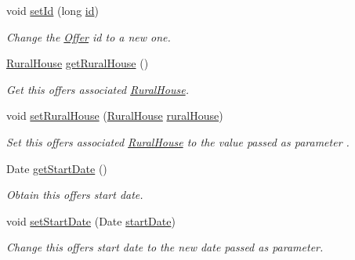 \begin{DoxyCompactItemize}
void \mbox{\hyperlink{classcom_1_1ruralhousejsf_1_1domain_1_1_offer_a470323b09c0c64417eb21c748d008045}{set\+Id}} (long \mbox{\hyperlink{classcom_1_1ruralhousejsf_1_1domain_1_1_offer_aba6516f5b9bb2dbe5d8b99404335adfc}{id}})
\begin{DoxyCompactList}\small\item\em Change the \mbox{\hyperlink{classcom_1_1ruralhousejsf_1_1domain_1_1_offer}{Offer}} id to a new one. \end{DoxyCompactList}\item 
\mbox{\hyperlink{classcom_1_1ruralhousejsf_1_1domain_1_1_rural_house}{Rural\+House}} \mbox{\hyperlink{classcom_1_1ruralhousejsf_1_1domain_1_1_offer_a431afac3e582055bb908b715f2d22bdd}{get\+Rural\+House}} ()
\begin{DoxyCompactList}\small\item\em Get this offers associated \mbox{\hyperlink{classcom_1_1ruralhousejsf_1_1domain_1_1_rural_house}{Rural\+House}}. \end{DoxyCompactList}\item 
void \mbox{\hyperlink{classcom_1_1ruralhousejsf_1_1domain_1_1_offer_ab10c2d200d23aff2383f720b1dcecd02}{set\+Rural\+House}} (\mbox{\hyperlink{classcom_1_1ruralhousejsf_1_1domain_1_1_rural_house}{Rural\+House}} \mbox{\hyperlink{classcom_1_1ruralhousejsf_1_1domain_1_1_offer_a87036858904c59c964d2c75137a97323}{rural\+House}})
\begin{DoxyCompactList}\small\item\em Set this offers associated \mbox{\hyperlink{classcom_1_1ruralhousejsf_1_1domain_1_1_rural_house}{Rural\+House}} to the value passed as parameter . \end{DoxyCompactList}\item 
Date \mbox{\hyperlink{classcom_1_1ruralhousejsf_1_1domain_1_1_offer_a41039d86fd455568f6623996b639b7a5}{get\+Start\+Date}} ()
\begin{DoxyCompactList}\small\item\em Obtain this offers start date. \end{DoxyCompactList}\item 
void \mbox{\hyperlink{classcom_1_1ruralhousejsf_1_1domain_1_1_offer_ad829c57ed6d018c673d4fff942757ed4}{set\+Start\+Date}} (Date \mbox{\hyperlink{classcom_1_1ruralhousejsf_1_1domain_1_1_offer_a3c4e8f6eb72413f6f76b1e4b05404ea8}{start\+Date}})
\begin{DoxyCompactList}\small\item\em Change this offers start date to the new date passed as parameter. \end{DoxyCompactList}\item 

\end{DoxyCompactItemize}
